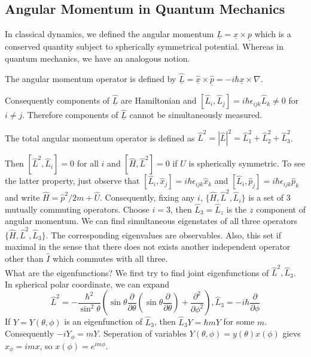 \subsection{Angular Momentum in Quantum Mechanics}
In classical dynamics, we defined the angular momentum $\underline{L}=\underline{x}\times\underline{p}$ which is a conserved quantity subject to spherically symmetrical potential.
Whereas in quantum mechanics, we have an analogous notion.
\begin{definition}
    The angular momentum operator is defined by $\underline{\hat{L}}=\underline{\hat{x}}\times\underline{\hat{p}}=-i\hbar\underline{x}\times\nabla$.
\end{definition}
Consequently components of $\underline{\hat{L}}$ are Hamiltonian and $[\hat{L}_i,\hat{L}_j]=i\hbar\epsilon_{ijk}\hat{L}_k\neq 0$ for $i\neq j$.
Therefore components of $\underline{\hat{L}}$ cannot be simultaneously measured.
\begin{definition}
    The total angular momentum operator is defined as $\hat{L}^2=|\hat{L}|^2=\hat{L}_1^2+\hat{L}_2^2+\hat{L}_3^2$.
\end{definition}
Then $[\hat{L}^2,\hat{L}_i]=0$ for all $i$ and $[\hat{H},\hat{L}^2]=0$ if $U$ is spherically symmetric.
To see the latter property, just observe that $[\hat{L}_i,\hat{x}_j]=i\hbar\epsilon_{ijk}\hat{x}_k$ and $[\hat{L}_i,\hat{p}_j]=i\hbar\epsilon_{ijk}\hat{p}_k$ and write $\hat{H}=\hat{p}^2/2m+\hat{U}$.
Consequently, fixing any $i$, $\{\hat{H},\hat{L}^2,\hat{L}_i\}$ is a set of $3$ mutually commuting operators.
Choose $i=3$, then $\hat{L}_3=\hat{L}_z$ is the $z$ component of angular momentum.
We can find simultaneous eigenstates of all three operators $\{\hat{H},\hat{L}^2,\hat{L}_3\}$.
The corresponding eigenvalues are observables.
Also, this set if maximal in the sense that there does not exists another independent operator other than $\hat{I}$ which commutes with all three.\\
What are the eigenfunctions?
We first try to find joint eigenfunctions of $\hat{L}^2,\hat{L}_3$.
In spherical polar coordinate, we can expand
$$\hat{L}^2=-\frac{\hbar^2}{\sin^2\theta}\left( \sin\theta\frac{\partial}{\partial\theta}\left( \sin\theta\frac{\partial}{\partial\theta} \right)+\frac{\partial^2}{\partial\phi^2} \right),\hat{L}_3=-i\hbar\frac{\partial}{\partial\phi}$$
If $Y=Y(\theta,\phi)$ is an eigenfunction of $\hat{L}_3$, then $\hat{L}_3Y=\hbar mY$ for some $m$.
Consequently $-iY_\phi=mY$.
Seperation of variables $Y(\theta,\phi)=y(\theta)x(\phi)$ gievs $x_\phi=imx$, so $x(\phi)=e^{im\phi}$.
